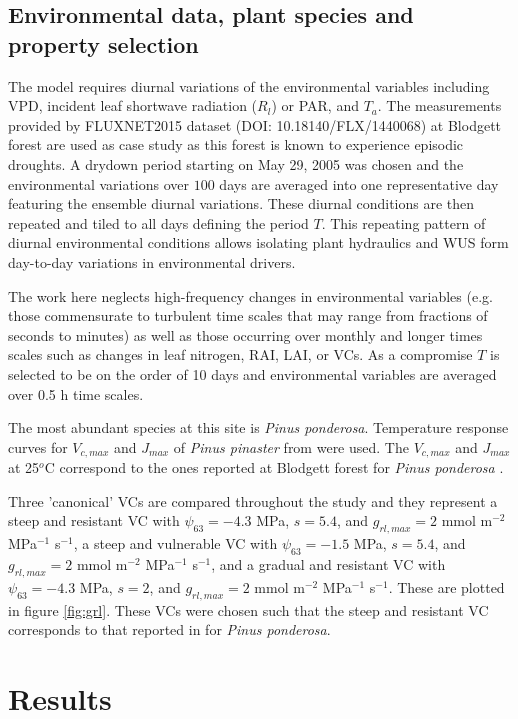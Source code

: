 \documentclass[utf8]{frontiersSCNS} %
\begin{document}
\subsection{Environmental data, plant species and property selection}

The model requires diurnal variations of the environmental variables including VPD, incident leaf shortwave radiation ($R_l$) or PAR, and $T_a$. The measurements provided by FLUXNET2015 dataset (DOI: 10.18140/FLX/1440068) at Blodgett forest are used as case study as this forest is known to experience episodic droughts. A drydown period starting on May 29, 2005 was chosen and the environmental variations over $100$ days are averaged into one representative day featuring the ensemble diurnal variations. These diurnal conditions are then repeated and tiled to all days defining the period $T$. This repeating pattern of diurnal environmental conditions allows isolating plant hydraulics and WUS form day-to-day variations in environmental drivers.

The work here neglects high-frequency changes in environmental variables (e.g. those commensurate to turbulent time scales that may range from fractions of seconds to minutes) as well as those occurring over monthly and longer times scales such as changes in leaf nitrogen, RAI, LAI, or VCs. As a compromise $T$ is selected to be on the order of 10 days and environmental variables are averaged over 0.5 h time scales.

The most abundant species at this site is \textit{Pinus ponderosa}. Temperature response curves for $V_{c,max}$ and $J_{max}$ of \textit{Pinus pinaster} from \citep{medlyn_temperature_2002} were used.  The $V_{c,max}$ and $J_{max}$ at 25$^o$C  correspond to the ones reported at Blodgett forest for \textit{Pinus ponderosa} \citep{panek2004ozone}.

Three 'canonical' VCs are compared throughout the study and they represent a steep and resistant VC with $\psi_{63} = -4.3$ MPa, $s=5.4$, and $g_{rl,max} = 2$ mmol m$^{-2}$ MPa$^{-1}$ s$^{-1}$, a steep and vulnerable VC with $\psi_{63} = -1.5$ MPa, $s=5.4$, and $g_{rl,max} = 2$ mmol m$^{-2}$ MPa$^{-1}$ s$^{-1}$, and a gradual and resistant VC with $\psi_{63} = -4.3$ MPa, $s=2$, and $g_{rl,max} = 2$ mmol m$^{-2}$ MPa$^{-1}$ s$^{-1}$. These are plotted in figure \ref{fig:grl}. These VCs were chosen such that the steep and resistant VC corresponds to that reported in \citet{hubbard2001stomatal} for \textit{Pinus ponderosa}.
\section{Results}
\end{document}
